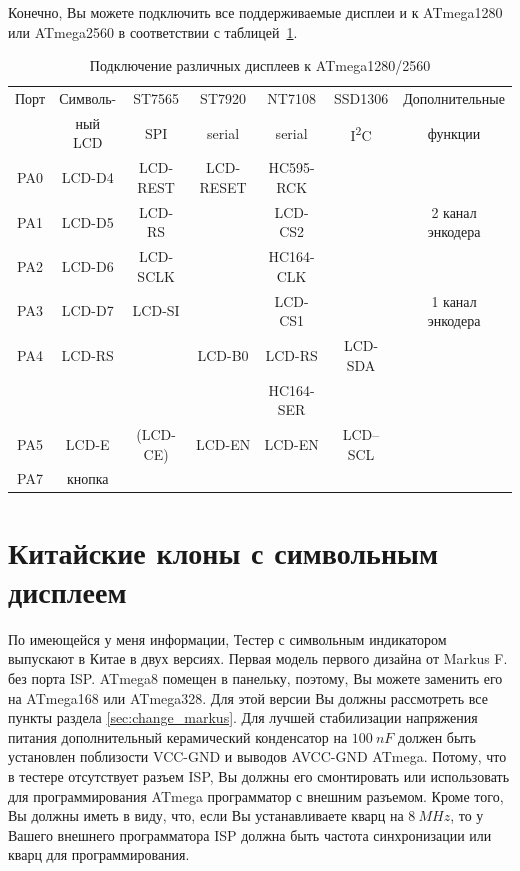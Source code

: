 Конечно, Вы можете подключить все поддерживаемые дисплеи и к ATmega1280 или ATmega2560
в соответствии с таблицей~\ref{tab:display-1280}.

\begin{table}[H]
  \begin{center}
    \begin{tabular}{| c || c | c | c | c | c | c |}
    \hline
      Порт & Символь-  &  ST7565     & ST7920       & NT7108       & SSD1306     & Дополнительные \\
           & ный LCD   &    SPI      & serial       & serial       & I\textsuperscript{2}C & функции \\
    \hline
    \hline
    PA0    &  LCD-D4   &   LCD-REST  &  LCD-RESET   & HC595-RCK      &             & \\
    \hline
    PA1    &  LCD-D5   &   LCD-RS    &              & LCD-CS2        &             & 2 канал энкодера \\
    \hline
    PA2    &  LCD-D6   &   LCD-SCLK  &              & HC164-CLK      &             & \\
    \hline
    PA3    &  LCD-D7   &   LCD-SI    &              & LCD-CS1        &             & 1 канал энкодера \\
    \hline
    PA4    &  LCD-RS   &             &   LCD-B0     & LCD-RS         &   LCD-SDA   & \\
           &           &             &              & HC164-SER      &             & \\
    \hline
    PA5    &  LCD-E    &   (LCD-CE)  &   LCD-EN     & LCD-EN         &   LCD--SCL  & \\
    \hline
    PA7    &  кнопка   &             &              &                &             & \\
    \hline
    \end{tabular}
  \end{center}
  \caption{Подключение различных дисплеев к ATmega1280/2560}
  \label{tab:display-1280}
\end{table}
\section{Китайские клоны с символьным дисплеем}
По имеющейся у меня информации, Тестер с символьным индикатором выпускают в Китае в двух версиях.
Первая модель первого дизайна от Markus F. 
без порта ISP. ATmega8 помещен в панельку, поэтому, Вы можете заменить его на ATmega168 или ATmega328. Для этой версии 
Вы должны рассмотреть все пункты раздела  \ref{sec:change_markus}.
Для лучшей стабилизации напряжения питания дополнительный керамический конденсатор на \(100~nF\) должен быть установлен 
поблизости VCC-GND и выводов AVCC-GND ATmega. Потому, что в тестере отсутствует разъем ISP, Вы должны его смонтировать
или использовать для программирования ATmega программатор с внешним разъемом.   
Кроме того, Вы должны иметь в виду, что, если Вы устанавливаете кварц 
на \(8~MHz\), то у Вашего внешнего программатора ISP должна быть частота синхронизации или кварц для программирования.\\

